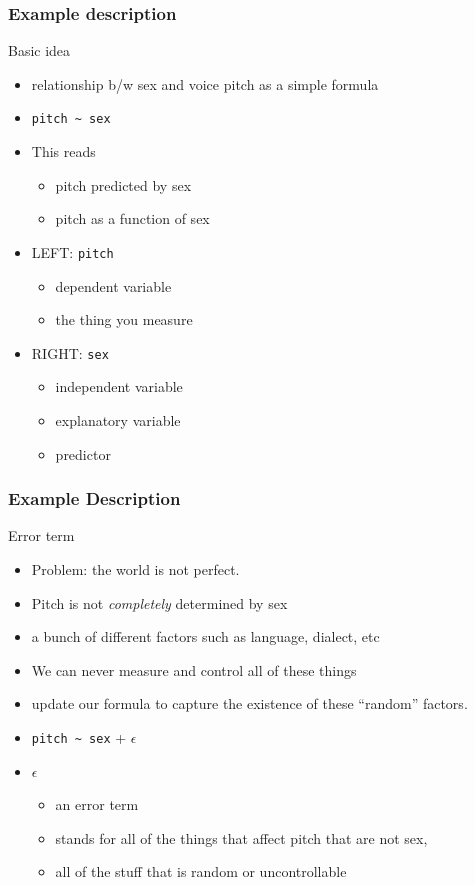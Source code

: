 \documentclass{beamer}\usepackage[]{graphicx}\usepackage[]{color}
\begin{document}
\begin{frame}[fragile]
\frametitle{Example description}
Basic idea
\begin{itemize}
\item relationship b/w sex and voice pitch as a simple formula
\item \verb|pitch ~ sex|
\item This reads
	\begin{itemize}
	\item pitch predicted by sex
	\item pitch as a function of sex
	\end{itemize}
\item LEFT: \texttt{pitch}
	\begin{itemize}
	\item dependent variable
	\item the thing you measure
	\end{itemize}
\item RIGHT: \texttt{sex}
	\begin{itemize}
	\item independent variable
	\item explanatory variable
	\item predictor
	\end{itemize}
\end{itemize}
\end{frame}

\begin{frame}[fragile]
\frametitle{Example Description}
Error term
\begin{itemize}
\item Problem: the world is not perfect.
\item Pitch is not \textit{completely} determined by sex
\item a bunch of different factors such as language, dialect, etc
\item We can never measure and control all of these things
\item update our formula to capture the existence of these ``random'' factors.
\item \verb|pitch ~ sex| + $\epsilon$ 
\item $\epsilon$
	\begin{itemize}
	\item an error term
	\item stands for all of the things that affect pitch that are not sex,
	\item all of the stuff that is random or uncontrollable
	\end{itemize}
\end{itemize}

\end{frame}
\end{document}
